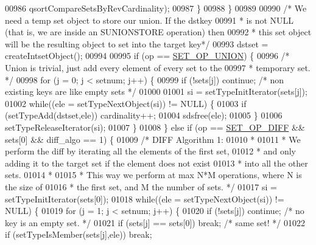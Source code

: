 \begin{DoxyCode}
00986                 qsortCompareSetsByRevCardinality);
00987         \}
00988     \}
00989 
00990     \textcolor{comment}{/* We need a temp set object to store our union. If the dstkey}
00991 \textcolor{comment}{     * is not NULL (that is, we are inside an SUNIONSTORE operation) then}
00992 \textcolor{comment}{     * this set object will be the resulting object to set into the target key*/}
00993     dstset = createIntsetObject();
00994 
00995     \textcolor{keywordflow}{if} (op == \hyperlink{server_8h_af00a414b6d78bff8b325eb9cf82c3edb}{SET\_OP\_UNION}) \{
00996         \textcolor{comment}{/* Union is trivial, just add every element of every set to the}
00997 \textcolor{comment}{         * temporary set. */}
00998         \textcolor{keywordflow}{for} (j = 0; j < setnum; j++) \{
00999             \textcolor{keywordflow}{if} (!sets[j]) \textcolor{keywordflow}{continue}; \textcolor{comment}{/* non existing keys are like empty sets */}
01000 
01001             si = setTypeInitIterator(sets[j]);
01002             \textcolor{keywordflow}{while}((ele = setTypeNextObject(si)) != NULL) \{
01003                 \textcolor{keywordflow}{if} (setTypeAdd(dstset,ele)) cardinality++;
01004                 sdsfree(ele);
01005             \}
01006             setTypeReleaseIterator(si);
01007         \}
01008     \} \textcolor{keywordflow}{else} \textcolor{keywordflow}{if} (op == \hyperlink{server_8h_ad22703ffec4b7bf6cd262099917dc6a1}{SET\_OP\_DIFF} && sets[0] && diff\_algo == 1) \{
01009         \textcolor{comment}{/* DIFF Algorithm 1:}
01010 \textcolor{comment}{         *}
01011 \textcolor{comment}{         * We perform the diff by iterating all the elements of the first set,}
01012 \textcolor{comment}{         * and only adding it to the target set if the element does not exist}
01013 \textcolor{comment}{         * into all the other sets.}
01014 \textcolor{comment}{         *}
01015 \textcolor{comment}{         * This way we perform at max N*M operations, where N is the size of}
01016 \textcolor{comment}{         * the first set, and M the number of sets. */}
01017         si = setTypeInitIterator(sets[0]);
01018         \textcolor{keywordflow}{while}((ele = setTypeNextObject(si)) != NULL) \{
01019             \textcolor{keywordflow}{for} (j = 1; j < setnum; j++) \{
01020                 \textcolor{keywordflow}{if} (!sets[j]) \textcolor{keywordflow}{continue}; \textcolor{comment}{/* no key is an empty set. */}
01021                 \textcolor{keywordflow}{if} (sets[j] == sets[0]) \textcolor{keywordflow}{break}; \textcolor{comment}{/* same set! */}
01022                 \textcolor{keywordflow}{if} (setTypeIsMember(sets[j],ele)) \textcolor{keywordflow}{break};

\end{DoxyCode}
